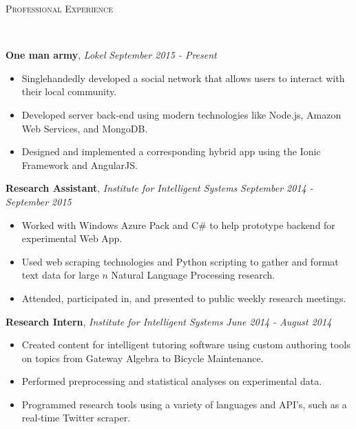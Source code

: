 \documentclass[10pt]{article}
\newenvironment{changemargin}[2]{%
  \begin{list}{}{%
    \setlength{\topsep}{0pt}%
    \setlength{\leftmargin}{#1}%
    \setlength{\rightmargin}{#2}%
    \setlength{\listparindent}{\parindent}%
    \setlength{\itemindent}{\parindent}%
    \setlength{\parsep}{\parskip}%
  }%
  \item[]}{\end{list}
}
\newcommand{\lineover}{
	\begin{changemargin}{-0.05in}{-0.05in}
		\vspace*{-8pt}
		\hrulefill \\
		\vspace*{-2pt}
	\end{changemargin}
}
\newcommand{\header}[1]{
	\begin{changemargin}{-0.5in}{-0.5in}
		\scshape{#1}\\
  	\lineover
	\end{changemargin}
}
\newenvironment{body} {
	\vspace*{-16pt}
	\begin{changemargin}{-0.25in}{-0.5in}
  }	
	{\end{changemargin}
}
\begin{document}







\header{Professional Experience}

\begin{body}
	\vspace{14pt}
	
	\textbf{One man army}, \emph{Lokel} \hfill \emph{September 2015 - Present}\\
	\vspace*{-4pt}
	\begin{itemize} \itemsep -0pt  %
		\item Singlehandedly developed a social network that allows users to interact with their local community.
		\item Developed server back-end using modern technologies like Node.js, Amazon Web Services, and MongoDB.
		\item Designed and implemented a corresponding hybrid app using the Ionic Framework and AngularJS.
	\end{itemize}
    
	\textbf{Research Assistant}, \emph{Institute for Intelligent Systems} \hfill \emph{September 2014 - September 2015}\\
	\vspace*{-4pt}
	\begin{itemize} \itemsep -0pt  %
		\item Worked with Windows Azure Pack and C\# to help prototype backend for experimental Web App.
		\item Used web scraping technologies and Python scripting to gather and format text data for large $n$ Natural Language Processing research.
		\item Attended, participated in, and presented to public weekly research meetings.
	\end{itemize}
	
	\textbf{Research Intern}, \emph{Institute for Intelligent Systems} \hfill \emph{June 2014 - August 2014}\\
	\vspace*{-4pt}
	\begin{itemize} \itemsep -0pt  %
		\item Created content for intelligent tutoring software using custom authoring tools on topics from Gateway Algebra to Bicycle Maintenance.
		\item Performed preprocessing and statistical analyses on experimental data.
		\item Programmed research tools using a variety of languages and API's, such as a real-time Twitter scraper.
	\end{itemize}
	


\end{body}
\end{document}
